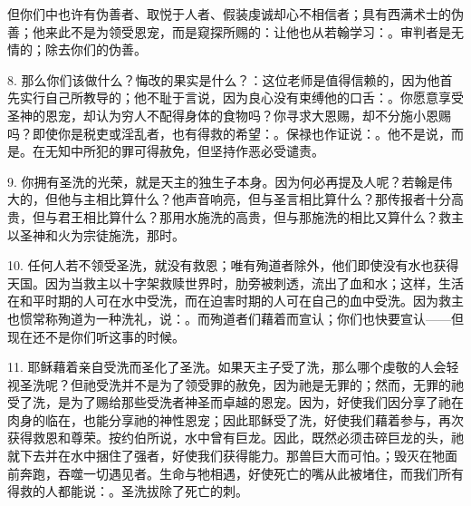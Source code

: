 但你们中也许有伪善者、取悦于人者、假装虔诚却心不相信者；具有西满术士的伪善；他来此不是为领受恩宠，而是窥探所赐的：让他也从若翰学习：。审判者是无情的；除去你们的伪善。\par

8. 那么你们该做什么？悔改的果实是什么？：这位老师是值得信赖的，因为他首先实行自己所教导的；他不耻于言说，因为良心没有束缚他的口舌：。你愿意享受圣神的恩宠，却认为穷人不配得身体的食物吗？你寻求大恩赐，却不分施小恩赐吗？即使你是税吏或淫乱者，也有得救的希望：。保禄也作证说：。他不是说，而是。在无知中所犯的罪可得赦免，但坚持作恶必受谴责。\par

9. 你拥有圣洗的光荣，就是天主的独生子本身。因为何必再提及人呢？若翰是伟大的，但他与主相比算什么？他声音响亮，但与圣言相比算什么？那传报者十分高贵，但与君王相比算什么？那用水施洗的高贵，但与那施洗的相比又算什么？救主以圣神和火为宗徒施洗，那时。\par

10. 任何人若不领受圣洗，就没有救恩；唯有殉道者除外，他们即使没有水也获得天国。因为当救主以十字架救赎世界时，肋旁被刺透，流出了血和水；这样，生活在和平时期的人可在水中受洗，而在迫害时期的人可在自己的血中受洗。因为救主也惯常称殉道为一种洗礼，说：。而殉道者们藉着而宣认；你们也快要宣认——但现在还不是你们听这事的时候。\par

11. 耶稣藉着亲自受洗而圣化了圣洗。如果天主子受了洗，那么哪个虔敬的人会轻视圣洗呢？但祂受洗并不是为了领受罪的赦免，因为祂是无罪的；然而，无罪的祂受了洗，是为了赐给那些受洗者神圣而卓越的恩宠。因为，好使我们因分享了祂在肉身的临在，也能分享祂的神性恩宠；因此耶稣受了洗，好使我们藉着参与，再次获得救恩和尊荣。按约伯所说，水中曾有巨龙。因此，既然必须击碎巨龙的头，祂就下去并在水中捆住了强者，好使我们获得能力。那兽巨大而可怕。；毁灭在牠面前奔跑，吞噬一切遇见者。生命与牠相遇，好使死亡的嘴从此被堵住，而我们所有得救的人都能说：。圣洗拔除了死亡的刺。\par

